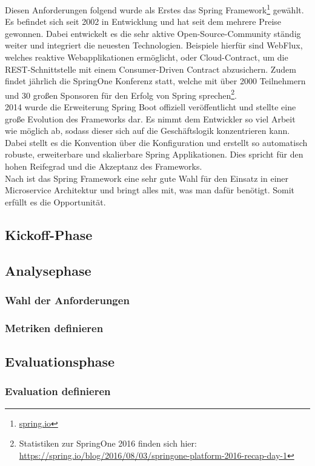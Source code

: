 Diesen Anforderungen folgend wurde als Erstes das Spring Framework\footnote{\url{spring.io}} gewählt. Es befindet sich seit 2002 in Entwicklung und hat seit dem mehrere Preise gewonnen\cite{Gutierrez2016}. Dabei entwickelt es die sehr aktive Open-Source-Community ständig weiter und integriert die neuesten Technologien. Beispiele hierfür sind WebFlux, welches reaktive Webapplikationen ermöglicht, oder Cloud-Contract, um die \ac{REST}-Schnittstelle mit einem Consumer-Driven Contract abzusichern. Zudem findet jährlich die SpringOne Konferenz statt, welche mit über 2000 Teilnehmern und 30 großen Sponsoren für den Erfolg von Spring sprechen\footnote{
Statistiken zur SpringOne 2016 finden sich hier: \url{https://spring.io/blog/2016/08/03/springone-platform-2016-recap-day-1}
}.\\
2014 wurde die Erweiterung Spring Boot offiziell veröffentlicht und stellte eine große Evolution des Frameworks dar. Es nimmt dem Entwickler so viel Arbeit wie möglich ab, sodass dieser sich auf die Geschäftslogik konzentrieren kann. Dabei stellt es die Konvention über die Konfiguration und erstellt so automatisch robuste, erweiterbare und skalierbare Spring Applikationen\cite[1]{Gutierrez2016}. Dies spricht für den hohen Reifegrad und die Akzeptanz des Frameworks.\\
Nach \cite{Wolff2016} ist das Spring Framework eine sehr gute Wahl für den Einsatz in einer Microservice Architektur und bringt alles mit, was man dafür benötigt. Somit erfüllt es die Opportunität. 

\subsection{Kickoff-Phase}
\subsection{Analysephase}
\subsubsection{Wahl der Anforderungen}
\subsubsection{Metriken definieren}
\subsection{Evaluationsphase}
\subsubsection{Evaluation definieren}

